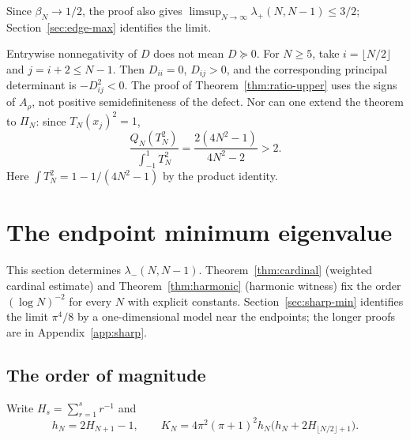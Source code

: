 \documentclass{siamart251216}
\newcommand{\Pn}{\Pi}
\begin{document}
Since $\beta_N\to1/2$, the proof also gives
$\limsup_{N\to\infty}\lambda_+(N,N-1)\le3/2$; Section~\ref{sec:edge-max}
identifies the limit.

\begin{remark}\label{rem:sign-boundary}%
Entrywise nonnegativity of $D$ does not mean $D\succeq0$.
For $N\ge5$, take $i=\lfloor N/2\rfloor$ and $j=i+2\le N-1$.
Then $D_{ii}=0$, $D_{ij}>0$, and the corresponding principal determinant
is $-D_{ij}^2<0$.%
 The proof of Theorem~\ref{thm:ratio-upper} uses the signs of $A_\rho$, not
positive semidefiniteness of the defect. Nor can one extend the theorem
to $\Pn_N$: since $T_N(x_j)^2=1$,
\begin{equation}\label{eq:full}
 \frac{Q_N(T_N^2)}{\int_{-1}^1T_N^2}
 =\frac{2(4N^2-1)}{4N^2-2}>2
 .%
\end{equation}
Here $\int T_N^2=1-1/(4N^2-1)$ by the product identity.
\end{remark}

\section{The endpoint minimum eigenvalue}\label{sec:endpoint}

This section determines $\lambda_-(N,N-1)$. Theorem~\ref{thm:cardinal}
(weighted cardinal estimate) and Theorem~\ref{thm:harmonic} (harmonic
witness) fix the order $(\log N)^{-2}$ for every $N$ with explicit constants.
Section~\ref{sec:sharp-min} identifies the limit $\pi^4/8$ by a
one-dimensional model near the endpoints; the longer proofs are in
Appendix~\ref{app:sharp}.

\subsection{The order of magnitude}\label{sec:order-min}

Write $H_s=\sum_{r=1}^s r^{-1}$ and
\begin{equation}\label{eq:KN}
 h_N=2H_{N+1}-1,\qquad
 K_N=4\pi^2(\pi+1)^2h_N
       \bigl(h_N+2H_{\lfloor N/2\rfloor+1}\bigr).
\end{equation}
\end{document}
